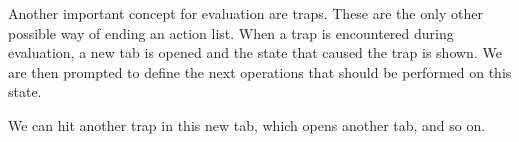\documentclass{report}
\begin{document}
Another important concept for evaluation are traps. These are the only other possible way of ending an action list.
When a trap is encountered during evaluation, a new tab is opened and the state that caused the trap is shown.
We are then prompted to define the next operations that should be performed on this state.

We can hit another trap in this new tab, which opens another tab, and so on.
\end{document}
